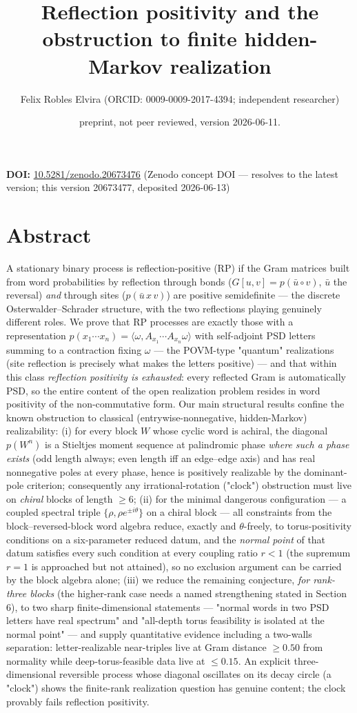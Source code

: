 \documentclass[11pt]{article}
\title{Reflection positivity and the obstruction to finite hidden-Markov realization}
\author{Felix Robles Elvira (ORCID: 0009-0009-2017-4394; independent researcher)}
\date{\small preprint, not peer reviewed, version 2026-06-11.}
\begin{document}
\maketitle

\textbf{DOI:} \href{https://doi.org/10.5281/zenodo.20673476}{10.5281/zenodo.20673476} (Zenodo concept DOI — resolves to the latest version; this version 20673477, deposited 2026-06-13)

\section*{Abstract}
A stationary binary process is reflection-positive (RP) if the Gram matrices built from word probabilities by reflection through bonds ($G[u,v] = p(\bar u \circ v)$, $\bar u$ the reversal) \emph{and} through sites ($p(\bar u\,x\,v)$) are positive semidefinite — the discrete Osterwalder–Schrader structure, with the two reflections playing genuinely different roles.  We prove that RP processes are exactly those with a representation $p(x_1\cdots x_n) = \langle\omega, A_{x_1}\cdots A_{x_n}\omega\rangle$ with self-adjoint PSD letters summing to a contraction fixing $\omega$ — the POVM-type "quantum" realizations (site reflection is precisely what makes the letters positive) — and that within this class \emph{reflection positivity is exhausted}: every reflected Gram is automatically PSD, so the entire content of the open realization problem resides in word positivity of the non-commutative form.  Our main structural results confine the known obstruction to classical (entrywise-nonnegative, hidden-Markov) realizability: (i) for every block $W$ whose cyclic word is achiral, the diagonal $p(W^n)$ is a Stieltjes moment sequence at palindromic phase \emph{where such a phase exists} (odd length always; even length iff an edge–edge axis) and has real nonnegative poles at every phase, hence is positively realizable by the dominant-pole criterion; consequently any irrational-rotation ("clock") obstruction must live on \emph{chiral} blocks of length $\ge 6$; (ii) for the minimal dangerous configuration — a coupled spectral triple $\{\rho, \rho e^{\pm i\theta}\}$ on a chiral block — all constraints from the block–reversed-block word algebra reduce, exactly and $\theta$-freely, to torus-positivity conditions on a six-parameter reduced datum, and the \emph{normal point} of that datum satisfies every such condition at every coupling ratio $r < 1$ (the supremum $r = 1$ is approached but not attained), so no exclusion argument can be carried by the block algebra alone; (iii) we reduce the remaining conjecture, \emph{for rank-three blocks} (the higher-rank case needs a named strengthening stated in Section 6), to two sharp finite-dimensional statements — "normal words in two PSD letters have real spectrum" and "all-depth torus feasibility is isolated at the normal point" — and supply quantitative evidence including a two-walls separation: letter-realizable near-triples live at Gram distance $\ge 0.50$ from normality while deep-torus-feasible data live at $\le 0.15$.  An explicit three-dimensional reversible process whose diagonal oscillates on its decay circle (a "clock") shows the finite-rank realization question has genuine content; the clock provably fails reflection positivity.
\end{document}
